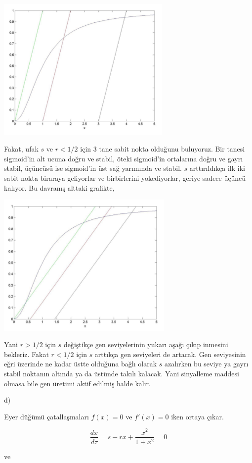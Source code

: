 \documentclass[12pt,fleqn]{article}\usepackage{../../common}
\begin{document}
\includegraphics[height=7cm]{08_08.png}

Fakat, ufak $s$ ve $r<1/2$ için 3 tane sabit nokta olduğunu buluyoruz. Bir
tanesi sigmoid'in alt ucuna doğru ve stabil, öteki sigmoid'in ortalarına doğru
ve gayrı stabil, üçüncüsü ise sigmoid'in üst sağ yarımında ve stabil. $s$
arttırıldıkça ilk iki sabit nokta biraraya geliyorlar ve birbirlerini
yokediyorlar, geriye sadece üçüncü kalıyor. Bu davranış alttaki grafikte,

\includegraphics[height=7cm]{08_09.png}

Yani $r>1/2$ için $s$ değiştikçe gen seviyelerinin yukarı aşağı çıkıp inmesini
bekleriz. Fakat $r<1/2$ için $s$ arttıkça gen seviyeleri de artacak. Gen
seviyesinin eğri üzerinde ne kadar üstte olduğuna bağlı olarak $s$ azalırken bu
seviye ya gayrı stabil noktanın altında ya da üstünde takılı kalacak. Yani
sinyalleme maddesi olmasa bile gen üretimi aktif edilmiş halde kalır. 

d)

Eyer düğümü çatallaşmaları $f(x)=0$ ve $f'(x)=0$ iken ortaya çıkar.

$$ \frac{dx}{d\tau} = s - rx + \frac{x^2}{1+x^2}=0 $$

ve
\end{document}
